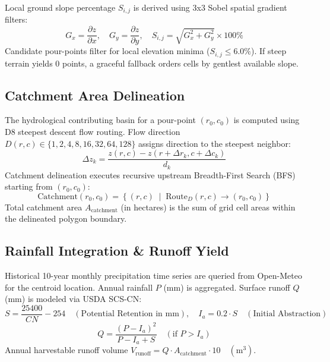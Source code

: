 \documentclass[manuscript,screen]{acmart}
\begin{document}
Local ground slope percentage $S_{i,j}$ is derived using 3x3 Sobel spatial gradient filters:
\begin{equation}
G_x = \frac{\partial z}{\partial x}, \quad G_y = \frac{\partial z}{\partial y}, \quad S_{i,j} = \sqrt{G_x^2 + G_y^2} \times 100\%
\end{equation}
Candidate pour-points filter for local elevation minima ($S_{i,j} \le 6.0\%$). If steep terrain yields 0 points, a graceful fallback orders cells by gentlest available slope.

\subsection{Catchment Area Delineation}
The hydrological contributing basin for a pour-point $(r_0, c_0)$ is computed using D8 steepest descent flow routing. Flow direction $D(r,c) \in \{1, 2, 4, 8, 16, 32, 64, 128\}$ assigns direction to the steepest neighbor:
\begin{equation}
\Delta z_k = \frac{z(r, c) - z(r + \Delta r_k, c + \Delta c_k)}{d_k}
\end{equation}
Catchment delineation executes recursive upstream Breadth-First Search (BFS) starting from $(r_0, c_0)$:
\begin{equation}
\text{Catchment}(r_0, c_0) = \left\{ (r, c) \;\middle|\; \text{Route}_D(r, c) \to (r_0, c_0) \right\}
\end{equation}
Total catchment area $A_{\text{catchment}}$ (in hectares) is the sum of grid cell areas within the delineated polygon boundary.

\subsection{Rainfall Integration \& Runoff Yield}
Historical 10-year monthly precipitation time series are queried from Open-Meteo for the centroid location. Annual rainfall $P$ (mm) is aggregated. Surface runoff $Q$ (mm) is modeled via USDA SCS-CN:
\begin{equation}
S = \frac{25400}{CN} - 254 \quad (\text{Potential Retention in mm}), \quad I_a = 0.2 \cdot S \quad (\text{Initial Abstraction})
\end{equation}
\begin{equation}
Q = \frac{(P - I_a)^2}{P - I_a + S} \quad (\text{if } P > I_a)
\end{equation}
Annual harvestable runoff volume $V_{\text{runoff}} = Q \cdot A_{\text{catchment}} \cdot 10 \quad (\text{m}^3)$.
\end{document}

